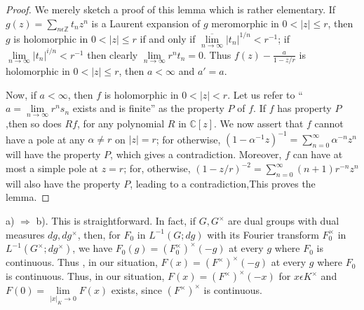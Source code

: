 \begin{proof}
  We merely sketch a proof of this lemma which is rather elementary. If
  $g(z)=\sum\limits_{n\epsilon \mathbb{Z}}t_{n}z^{n}$ is a Laurent
  expansion of $g$ meromorphic in $0<|z|\le r$, then $g$ is holomorphic
  in $0<|z|\le r$ if and only if $\overline{\lim\limits_{n\to
      \infty}}|t_{n}|^{1/n}<r^{-1}$; if $\lim\limits_{n\rightarrow
    \infty}|t_{n}|^{i/n}<r^{-1}$ then clearly $\lim\limits_{n\rightarrow
    \infty}r^{n}t_{n}=0$. Thus $f(z)-\frac{a}{1-z/r}$ is holomorphic in
  $0<|z|\le r$, then $a<\infty $ and $a'=a$.

  Now, if $a<\infty$, then $f$ is holomorphic in $0<|z|<r$. Let us
  refer to ``$a=\lim\limits_{n\rightarrow\infty}r^{n}s_{n}$ exists and
  is finite'' as the property $P$ of $f$. If $f$ has property $P$,then
  so does $Rf$, for any polynomial $R$ in $\mathbb{C}[z]$. We now
  assert that $f$ cannot have a pole at any $\alpha \neq r$ on $|z|=r$;
  for otherwise,
  $(1-\alpha^{-1}z)^{-1}=\sum\limits_{n=0}^{\infty}\alpha^{-n}z^{n}$
  will have the property $P$, which gives a contradiction. Moreover,
  $f$ can have at most a simple pole at $z=r$; for, otherwise,
  $(1-z/r)^{-2}=\sum\limits_{n=0}^{\infty}(n+1)r^{-n}z^{n}$ will also
  have the property $P$, leading to a contradiction,This proves the
  lemma.
\end{proof}


a) $\Rightarrow$ b). This is straightforward. In fact, if $G,G^{\times}$
are dual groups with dual measures $dg, dg^{\times}$, then, for $F_{0}$
in $L^{-1}(G; dg)$ with its Fourier transform  $F_{0}^{\times}$ in
$L^{-1}(G^{\times};dg^{\times})$, we have
$F_{0}(g)=(F_{0}^{\times})^{\times}(-g)$ at every $g$ where $F_{0}$ is
continuous. Thus , in our situation, $F(x)=(F^{\times})^{\times}(-g)$ at
every $g$ where $F_{0}$ is continuous. Thus, in our situation,
$F(x)=(F^{\times})^{\times}(-x)$ for $x\epsilon K^{\times}$ and
$F(0)=\lim\limits_{|x|_{K}\rightarrow 0}F(x)$ exists, since
$(F^{\times})^{\times}$ is continuous.

